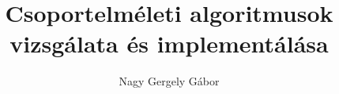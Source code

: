 \author{Nagy Gergely Gábor}
\title{Csoportelméleti algoritmusok vizsgálata és implementálása}
\date{}
\maketitle
{}
\clearpage
